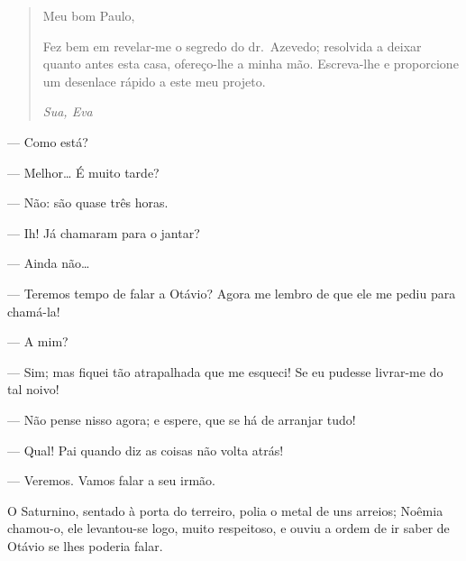 {

\begin{quote}
Meu bom Paulo,
\smallskip

\noindent{}Fez bem em revelar-me o segredo do dr.\,
Azevedo; resolvida a deixar quanto antes esta casa, ofereço-lhe a minha 
mão. Escreva-lhe e proporcione um desenlace rápido a este meu 
projeto.

\begin{flushright}
\textit{Sua, Eva}
\end{flushright}
\end{quote}


--- Como está?

--- Melhor\ldots{} É muito tarde?

--- Não: são quase três horas.

--- Ih! Já chamaram para o jantar?

--- Ainda não\ldots{}

--- Teremos tempo de falar a Otávio? Agora me lembro de
que ele me pediu para chamá-la!

--- A mim?

--- Sim; mas fiquei tão atrapalhada que me esqueci! Se eu
pudesse livrar-me do tal noivo!

--- Não pense nisso agora; e espere, que se há de
arranjar tudo!

--- Qual! Pai quando diz as coisas não volta atrás!

--- Veremos. Vamos falar a seu irmão.


O Saturnino, sentado à porta do terreiro, polia o metal
de uns arreios; Noêmia chamou-o, ele levantou-se logo, muito respeitoso,
e ouviu a ordem de ir saber de Otávio se lhes poderia falar.

}
